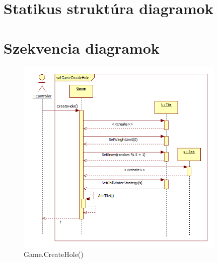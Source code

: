 \newpage
\section{Statikus struktúra diagramok}


\newpage
\section{Szekvencia diagramok}
\begin{figure}[H]
	\begin{center}
		\includegraphics[width=10cm]{chapters/chapter03/seqdiag/Game_CreateHole.png}
		\caption{Game.CreateHole()}
		\label{fig:GameCreateHole}
	\end{center}
\end{figure}
